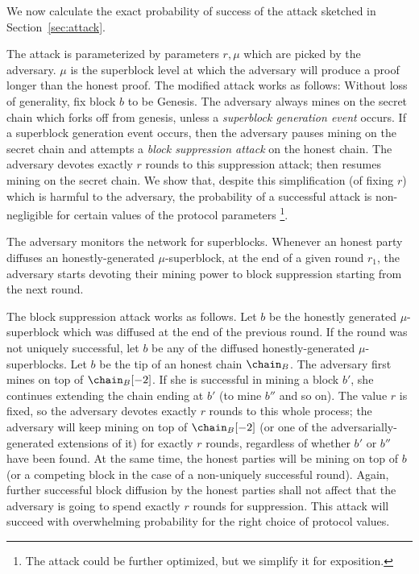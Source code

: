 \label{sec:attack-full}
We now calculate the exact probability of success of the attack sketched in
Section~\ref{sec:attack}.

The attack is parameterized by  parameters $r, \mu$ which are picked by the
adversary. $\mu$ is the superblock level at which the adversary will produce a
proof longer than the honest proof. The modified attack works as follows:
Without loss of generality, fix block $b$ to be Genesis. The adversary always
mines on the secret chain which forks off from genesis, unless a
\textit{superblock generation event} occurs. If a superblock generation event
occurs, then the adversary pauses mining on the secret chain and attempts a
\textit{block suppression attack} on the honest chain. The adversary devotes
exactly $r$ rounds to this suppression attack; then resumes mining on the secret
chain. We show that, despite this simplification (of fixing $r$) which is
harmful to the adversary, the probability of a successful attack is
non-negligible for certain values of the protocol parameters
\footnote{The attack could be further optimized, but we simplify it for
exposition.}.

The adversary monitors the network for superblocks. Whenever an honest party
diffuses an honestly-generated $\mu$-superblock,
at the end of a given round $r_1$, the adversary starts devoting their mining
power to block suppression starting from the next round.

The block suppression attack works as follows. Let $b$ be the honestly generated
$\mu$-superblock which was diffused at the end of the previous round. If the
round was not uniquely successful, let $b$ be any of the diffused
honestly-generated $\mu$-superblocks. Let $b$ be the tip of an honest chain
$\chain_B$. The adversary first mines on top of $\chain_B[-2]$. If she is
successful in mining a block $b'$, she continues extending the chain ending
at $b'$ (to mine $b''$ and so on). The value $r$ is fixed, so the adversary
devotes exactly $r$ rounds to this whole process; the adversary will keep mining
on top of $\chain_B[-2]$ (or one of the adversarially-generated extensions of
it) for exactly $r$ rounds, regardless of whether $b'$ or $b''$ have been found.
At the same time, the honest parties will be mining on top of $b$ (or a
competing block in the case of a non-uniquely successful round). Again, further
successful block diffusion by the honest parties shall not affect that the
adversary is going to spend exactly $r$ rounds for suppression.
This attack will succeed with overwhelming probability for the right choice
of protocol values.

